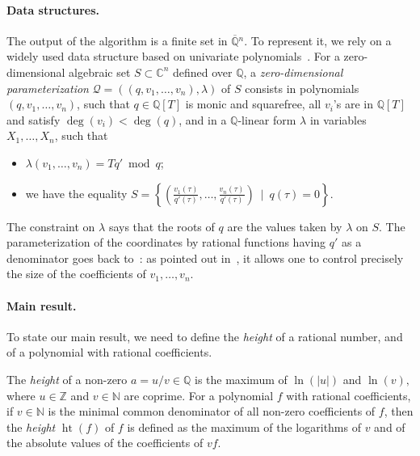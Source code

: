 \documentclass[12pt]{article}
\def\scrQ{\ensuremath{\mathscr{Q}}}
\DeclareMathOperator{\htt}{ht}
\def\C{\mathbb{C}}
\def\Q{\mathbb{Q}}
\begin{document}
\paragraph*{Data structures.} 
The output of the algorithm is a finite set in $\overline{\Q}{}^n$. To
represent it, we rely on a widely used data structure based on
univariate
polynomials~\cite{Kronecker82,Macaulay16,GiMo89,GiHeMoPa95,ABRW,GiHaHeMoMoPa97,GiHeMoMoPa98,Rouillier99}.
For a zero-dimensional algebraic set $S \subset \C^n$ defined over
$\Q$, a {\em zero-dimensional parameterization}
$\scrQ=((q,v_1,\dots,v_n),\lambda)$ of $S$ consists in polynomials
$(q,v_1,\dots,v_n)$, such that $q\in \Q[T]$ is monic and squarefree,
all $v_i$'s are in $\Q[T]$ and satisfy $\deg(v_i) < \deg(q)$, and in a
$\Q$-linear form $\lambda$ in variables $X_1,\dots,X_n$, such that
\begin{itemize}
\item $\lambda(v_1,\dots,v_n)=T q' \bmod q$;
\item we have the equality
  $S=\left \{\left(
      \frac{v_1(\tau)}{q'(\tau)},\dots,\frac{v_n(\tau)}{q'(\tau)}\right
    ) \ \mid \ q(\tau)=0 \right \}.$
\end{itemize}
The constraint on $\lambda$ says that the roots of $q$ are the values
taken by $\lambda$ on $S$. The parameterization of the coordinates by
rational functions having $q'$ as a denominator goes back
to~\cite{Kronecker82,Macaulay16}: as pointed out in~\cite{ABRW}, it
allows one to control precisely the size of the coefficients of
$v_1,\dots,v_n$.

\paragraph*{Main result.} To state our main result, we need to define 
the {\em height} of a rational number, and of a polynomial with
rational coefficients.

The {\em height} of a non-zero $a=u/v \in \Q$ is the maximum of
$\ln(|u|)$ and $\ln(v),$ where $u \in \mathbb{Z}$ and $v \in
\mathbb{N}$ are coprime. For a polynomial $f$ with rational
coefficients, if $v \in \mathbb N$ is the minimal common denominator
of all non-zero coefficients of $f$, then the \textit{height}
$\htt(f)$ of $f$ is defined as the maximum of the logarithms of $v$
and of the absolute values of the coefficients of $vf$.
\end{document}

